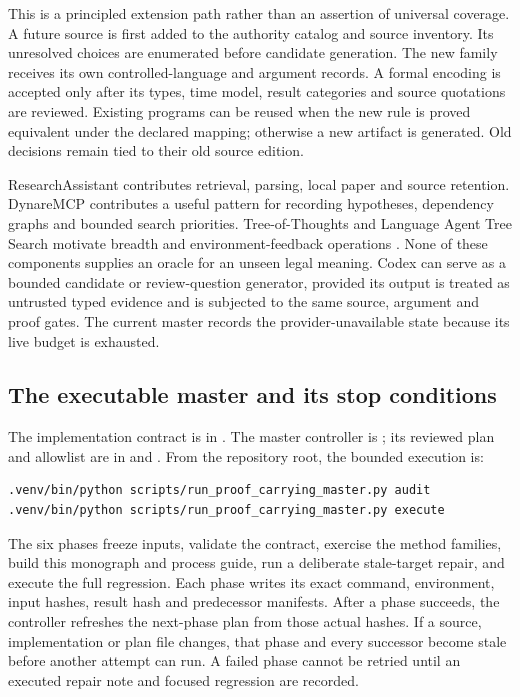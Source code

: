 \documentclass[12pt,a4paper,oneside,openany]{book}
\begin{document}
This is a principled extension path rather than an assertion of universal
coverage. A future source is first added to the authority catalog and source
inventory. Its unresolved choices are enumerated before candidate generation.
The new family receives its own controlled-language and argument records. A
formal encoding is accepted only after its types, time model, result categories
and source quotations are reviewed. Existing programs can be reused when the
new rule is proved equivalent under the declared mapping; otherwise a new
artifact is generated. Old decisions remain tied to their old source edition.

ResearchAssistant contributes retrieval, parsing, local paper and source
retention. DynareMCP contributes a useful pattern for recording hypotheses,
dependency graphs and bounded search priorities. Tree-of-Thoughts and Language
Agent Tree Search motivate breadth and environment-feedback operations
\citep{treeofthoughts2023,lats2024}. None of these components supplies an
oracle for an unseen legal meaning. Codex can serve as a bounded candidate or
review-question generator, provided its output is treated as untrusted typed
evidence and is subjected to the same source, argument and proof gates. The
current master records the provider-unavailable state because its live budget
is exhausted.

\subsection{The executable master and its stop conditions}

The implementation contract is in
. The
master controller is
; its reviewed plan and allowlist
are in  and
. From the
repository root, the bounded execution is:

\begin{lstlisting}
.venv/bin/python scripts/run_proof_carrying_master.py audit
.venv/bin/python scripts/run_proof_carrying_master.py execute
\end{lstlisting}

The six phases freeze inputs, validate the contract, exercise the method
families, build this monograph and process guide, run a deliberate stale-target
repair, and execute the full regression. Each phase writes its exact command,
environment, input hashes, result hash and predecessor manifests. After a
phase succeeds, the controller refreshes the next-phase plan from those actual
hashes. If a source, implementation or plan file changes, that phase and every
successor become stale before another attempt can run. A failed phase cannot be
retried until an executed repair note and focused regression are recorded.
\end{document}
